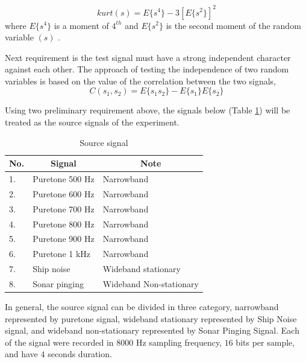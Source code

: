 \documentclass[a4paper]{jpconf}
\begin{document}
\begin{equation} \label{pers:kurt}
kurt(s) = E\{s^4\} - 3[E\{s^2\}]^2
\end{equation}
where $E\{s^4\}$ is a moment of $4^{th}$ and $E\{s^2\}$ is the second moment of the random variable $(s)$ \cite{3}.

Next requirement is the test signal must have a strong independent character against each other. The approach of testing the independence of two random variables is based on the value of the correlation between the two signals,
\begin{equation} \label{pers:corr}
C(s_1,s_2) = E\{s_1 s_2\} - E\{s_1\}E\{s_2\}
\end{equation}

Using two preliminary requirement above, the signals below (Table \ref{table:source}) will be treated as the source signals of the experiment.

\begin{table}[h]
\centering
\caption{Source signal}
\label{table:source}
\begin{tabular}{|l|l|l|}
\hline
\multicolumn{1}{|c|}{No.} & \multicolumn{1}{c|}{Signal} & \multicolumn{1}{c|}{Note} \\ \hline
1.                        & Puretone 500 Hz             & Narrowband                \\ \hline
2.                        & Puretone 600 Hz             & Narrowband                \\ \hline
3.                        & Puretone 700 Hz             & Narrowband                \\ \hline
4.                        & Puretone 800 Hz             & Narrowband                \\ \hline
5.                        & Puretone 900 Hz             & Narrowband                \\ \hline
6.                        & Puretone 1 kHz              & Narrowband                \\ \hline
7.                        & Ship noise                  & Wideband stationary       \\ \hline
8.                        & Sonar pinging               & Wideband Non-stationary   \\ \hline
\end{tabular}
\end{table}

In general, the source signal can be divided in three category, narrowband represented by puretone signal, wideband stationary represented by Ship Noise signal, and wideband non-stationary represented by Sonar Pinging Signal. Each of the signal were recorded in $8000$ Hz sampling frequency, $16$ bits per sample, and have $4$ seconds duration.
\end{document}

